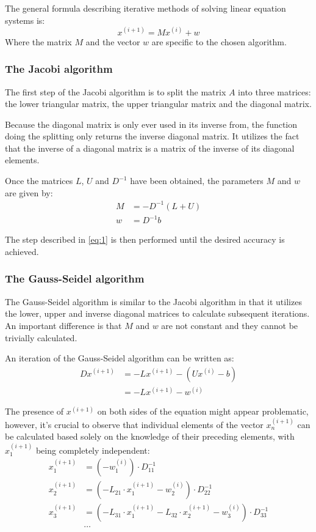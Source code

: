\documentclass{article}
\begin{document}
	The general formula describing iterative methods of solving linear equation
	systems is:
	\begin{equation}\label{eq:1}
		x^{(i + 1)} = Mx^{(i)} + w
	\end{equation}
	Where the matrix $M$ and the vector $w$ are specific to the chosen
	algorithm.

	\subsubsection{The Jacobi algorithm}

	The first step of the Jacobi algorithm is to split the matrix $A$ into three
	matrices: the lower triangular matrix, the upper triangular matrix and the
	diagonal matrix.

	Because the diagonal matrix is only ever used in its inverse from, the
	function doing the splitting only returns the inverse diagonal matrix. It
	utilizes the fact that the inverse of a diagonal matrix is a matrix of the
	inverse of its diagonal elements.

	Once the matrices $L$, $U$ and $D^{-1}$ have been obtained, the parameters
	$M$ and $w$ are given by:
	\begin{align*}
		M &= -D^{-1}(L + U)\\
		w &= D^{-1}b
	\end{align*}

	The step described in \eqref{eq:1} is then performed until the desired
	accuracy is achieved.

	\subsubsection{The Gauss-Seidel algorithm}

	The Gauss-Seidel algorithm is similar to the Jacobi algorithm in that it
	utilizes the lower, upper and inverse diagonal matrices to calculate
	subsequent iterations. An important difference is that $M$ and $w$ are not
	constant and they cannot be trivially calculated.

	An iteration of the Gauss-Seidel algorithm can be written as:
	\begin{align*}
		Dx^{(i + 1)} &= -Lx^{(i + 1)} - (Ux^{(i)} - b)\\
		&= -Lx^{(i + 1)} - w^{(i)}
	\end{align*}

	The presence of $x^{(i + 1)}$ on both sides of the equation might appear
	problematic, however, it's crucial to observe that individual elements of
	the vector $x_n^{(i + 1)}$ can be calculated based solely on the knowledge
	of their preceding elements, with $x_1^{(i + 1)}$ being completely
	independent:
	\begin{align*}
		x_1^{(i + 1)} &= (-w_1^{(i)}) \cdot D^{-1}_{11}\\
		x_2^{(i + 1)} &= (-L_{21} \cdot x_1^{(i + 1)} - w_2^{(i)})
		\cdot D^{-1}_{22}\\
		x_3^{(i + 1)} &= (-L_{31} \cdot x_1^{(i + 1)}
		- L_{32} \cdot x_2^{(i + 1)}
		- w_3^{(i)}) \cdot D^{-1}_{33}\\
		&\ldots
	\end{align*}
\end{document}
